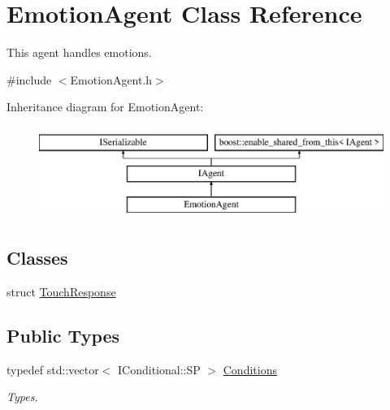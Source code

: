 \hypertarget{class_emotion_agent}{}\section{Emotion\+Agent Class Reference}
\label{class_emotion_agent}


This agent handles emotions.  




{\ttfamily \#include $<$Emotion\+Agent.\+h$>$}

Inheritance diagram for Emotion\+Agent\+:\begin{figure}[H]
\begin{center}
\leavevmode
\includegraphics[height=3.000000cm]{class_emotion_agent}
\end{center}
\end{figure}
\subsection*{Classes}
\begin{DoxyCompactItemize}
\item 
struct \hyperlink{struct_emotion_agent_1_1_touch_response}{Touch\+Response}
\end{DoxyCompactItemize}
\subsection*{Public Types}
\begin{DoxyCompactItemize}
\item 
\mbox{\label{class_emotion_agent_a1578745a702913f10ace02142df6163f}} 
typedef std\+::vector$<$ I\+Conditional\+::\+SP $>$ \hyperlink{class_emotion_agent_a1578745a702913f10ace02142df6163f}{Conditions}
\begin{DoxyCompactList}\small\item\em Types. \end{DoxyCompactList}\end{DoxyCompactItemize}
